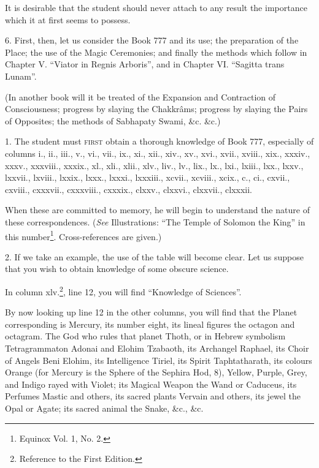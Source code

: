 It is desirable that the student should never attach to any result the importance which it at first seems to possess.

6. First, then, let us consider the Book 777 and its use; the preparation of the Place; the use of the Magic Ceremonies; and finally the methods which follow in Chapter V. \enquote{Viator in Regnis Arboris}, and in Chapter VI. \enquote{Sagitta trans Lunam}.

(In another book will it be treated of the Expansion and Contraction of Consciousness; progress by slaying the Chakkr\^{a}ms; progress by slaying the Pairs of Opposites; the methods of Sabhapaty Swami, \&c. \&c.)




1. The student must \textsc{first} obtain a thorough knowledge of Book 777, especially of columns i., ii., iii., v., vi., vii., ix., xi., xii., xiv., xv., xvi., xvii., xviii., xix., xxxiv., xxxv., xxxviii., xxxix., xl., xli., xlii., xlv., liv., lv., lix., lx., lxi., lxiii., lxx., lxxv., lxxvii., lxviii., lxxix., lxxx., lxxxi., lxxxiii., xcvii., xcviii., xcix., c., ci., cxvii., cxviii., cxxxvii., cxxxviii., cxxxix., clxxv., clxxvi., clxxvii., clxxxii.

When these are committed to memory, he will begin to understand the nature of these correspondences. (\textit{See} Illustrations: \enquote{The Temple of Solomon the King} in this number\footnote{Equinox Vol. 1, No. 2.}. Cross-references are given.)

2. If we take an example, the use of the table will become clear. Let us suppose that you wish to obtain knowledge of some obscure science.

In column xlv.\footnote{Reference to the First Edition.}, line 12, you will find \enquote{Knowledge of Sciences}.

By now looking up line 12 in the other columns, you will find that the Planet corresponding is Mercury, its number eight, its lineal figures the octagon and octagram. The God who rules that planet Thoth, or in Hebrew symbolism Tetragrammaton Adonai and Elohim Tzabaoth, its Archangel Raphael, its Choir of Angels Beni Elohim, its Intelligence Tiriel, its Spirit Taphtatharath, its colours Orange (for Mercury is the Sphere of the Sephira Hod, 8), Yellow, Purple, Grey, and Indigo rayed with Violet; its Magical Weapon the Wand or Caduceus, its Perfumes Mastic and others, its sacred plants Vervain and others, its jewel the Opal or Agate; its sacred animal the Snake, \&c., \&c.

